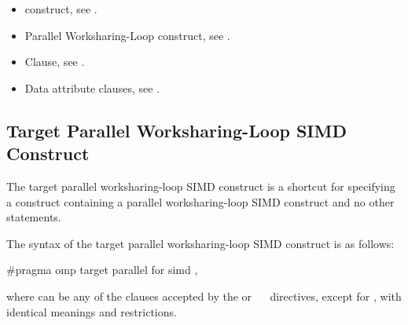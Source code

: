 \crossreferences
\begin{itemize}
\item {} construct, see
.

\item Parallel Worksharing-Loop construct, see
.

\item {} Clause, see .

\item Data attribute clauses, see
.
\end{itemize}



\subsection{Target Parallel Worksharing-Loop SIMD Construct}
\label{subsec:Target Parallel Worksharing-Loop SIMD Construct}
\summary
The target parallel worksharing-loop SIMD construct is a shortcut for specifying 
a  construct containing a parallel worksharing-loop SIMD construct 
and no other statements.

\syntax
\begin{ccppspecific}
The syntax of the target parallel worksharing-loop SIMD construct is as follows:

\begin{ompcPragma}
#pragma omp target parallel for simd \plc{[clause[
[},\plc{] clause] ... ] new-line}
\end{ompcPragma}

where  can be any of the clauses accepted by the  or
~~ directives, except for , 
with identical meanings and restrictions.
\end{ccppspecific}

